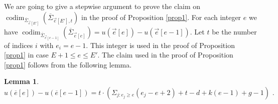 \documentclass{article}
\DeclareMathOperator{\codim}{codim}
\newtheorem{lemma}{Lemma}
\theoremstyle{definition}
\theoremstyle{remark}
\begin{document}
We are going to give a stepwise argument to prove the claim on $\codim _{\overline {\Sigma}_{\overrightarrow {e}[E']}}(\overline{\Sigma}_{\overrightarrow {e}[E'],t})$ in the proof of Proposition \ref{prop1}.
For each integer $e$ we have $\codim _{\overline {\Sigma}_{\overrightarrow {e}[e-1]}} (\overline {\Sigma} _{\overrightarrow {e} [e]})=u(\overrightarrow {e}[e])-u(\overrightarrow {e}[e-1])$.
Let $t$ be the number of indices $i$ with $e_i=e-1$.
This integer is used in the proof of Proposition \ref{prop1} in case $E+1 \leq e \leq E'$.
The claim used in the proof of Proposition \ref{prop1} follows from the  following lemma.

\begin{lemma}\label{lemma2}
\[
u(\overline {e}[e])-u(\overline {e}[e-1])=t \cdot (\Sigma _{j : e_j \geq e}(e_j-e+2)+t-d+k(e-1)+g-1) \text { .}
\]
\end{lemma}
\end{document}
